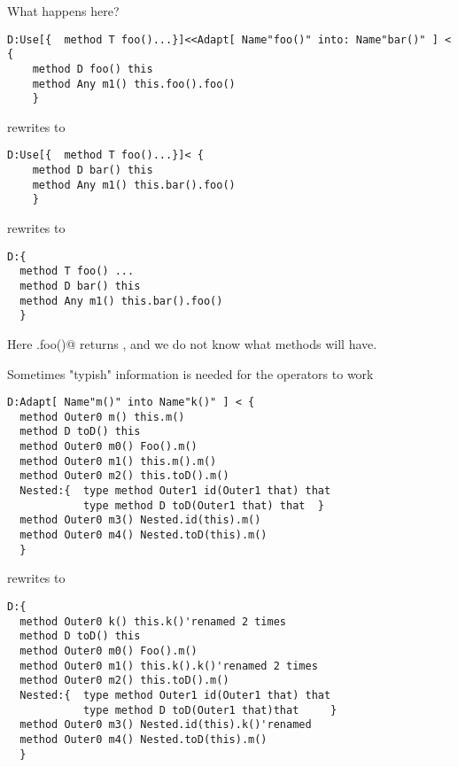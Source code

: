 \begin{frame}[fragile]
What happens here?
\begin{NiceCode}{59ex}{0.8}
\begin{lstlisting}
D:Use[{  method T foo()...}]<<Adapt[ Name"foo()" into: Name"bar()" ] < {
    method D foo() this
    method Any m1() this.foo().foo()
    }
\end{lstlisting}
\end{NiceCode}
rewrites to 
\begin{NiceCode}{59ex}{0.8}
\begin{lstlisting}
D:Use[{  method T foo()...}]< {
    method D bar() this
    method Any m1() this.bar().foo()
    }
\end{lstlisting}
\end{NiceCode}
rewrites to 
\begin{NiceCode}{59ex}{0.8}
\begin{lstlisting}
D:{
  method T foo() ...
  method D bar() this
  method Any m1() this.bar().foo()
  }
\end{lstlisting}
\end{NiceCode}
Here \Q@this.foo()@ returns \Q@D@, and we do not know what methods
\Q@D@ will have.
\end{frame}



\begin{frame}[fragile]
Sometimes "typish" information is needed for the operators to work
\begin{NiceCode}{59ex}{0.8}
\begin{lstlisting}
D:Adapt[ Name"m()" into Name"k()" ] < {
  method Outer0 m() this.m()
  method D toD() this
  method Outer0 m0() Foo().m()
  method Outer0 m1() this.m().m()
  method Outer0 m2() this.toD().m()
  Nested:{  type method Outer1 id(Outer1 that) that
            type method D toD(Outer1 that) that  }
  method Outer0 m3() Nested.id(this).m()
  method Outer0 m4() Nested.toD(this).m()
  }
\end{lstlisting}
\end{NiceCode}
rewrites to 

\begin{NiceCode}{59ex}{0.8}
\begin{lstlisting}
D:{
  method Outer0 k() this.k()'renamed 2 times
  method D toD() this
  method Outer0 m0() Foo().m()
  method Outer0 m1() this.k().k()'renamed 2 times
  method Outer0 m2() this.toD().m()
  Nested:{  type method Outer1 id(Outer1 that) that 
            type method D toD(Outer1 that)that     }
  method Outer0 m3() Nested.id(this).k()'renamed
  method Outer0 m4() Nested.toD(this).m()
  }
\end{lstlisting}
\end{NiceCode}
\end{frame}


